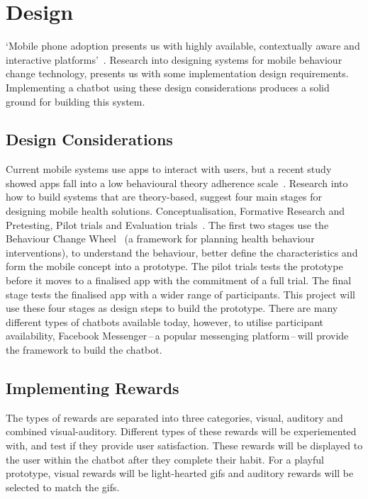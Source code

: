 
\newpage
\section{Design}

`Mobile phone adoption presents us with highly available, contextually aware and interactive platforms'~\cite{article_mhealth}.
Research into designing systems for mobile behaviour change technology, presents us with some implementation design requirements.
Implementing a chatbot using these design considerations produces a solid ground for building this system.\newline
\newline

\subsection{Design Considerations}
Current mobile systems use apps to interact with users, but a recent study showed apps fall into a low behavioural theory adherence scale~\cite{article_mhealth}.
Research into how to build systems that are theory-based, suggest four main stages for designing mobile health solutions. Conceptualisation, Formative Research and Pretesting,
Pilot trials and Evaluation trials~\cite{article_mhealth}. The first two stages use the Behaviour Change Wheel~\cite{article_behaviour_change_wheel}
(a framework for planning health behaviour interventions), to understand the behaviour, better define the characteristics and form the mobile concept into a prototype.
The pilot trials tests the prototype before it moves to a finalised app with the commitment of a full trial. The final stage tests the finalised app with a wider range of participants.
This project will use these four stages as design steps to build the prototype.\newline
\newline
There are many different types of chatbots available today, however, to utilise participant availability,
Facebook Messenger\,--\,a popular messenging platform\,--\,will provide the framework to build the chatbot.

\subsection{Implementing Rewards}
The types of rewards are separated into three categories, visual, auditory and combined visual-auditory. Different types of these rewards will be experiemented with,
and test if they provide user satisfaction. These rewards will be displayed to the user within the chatbot after they complete their habit.
For a playful prototype, visual rewards will be light-hearted gifs and auditory rewards will be selected to match the gifs.

